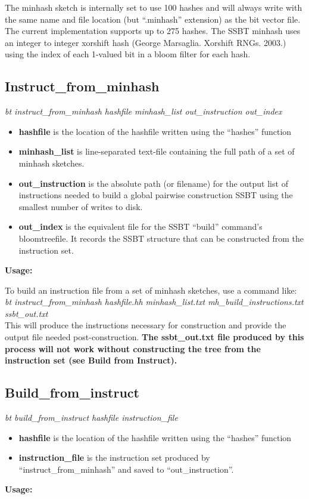 \documentclass{article}
\begin{document}
The minhash sketch is internally set to use 100 hashes and will always write with the same name and file location (but ``.minhash'' extension) as the bit vector file. The current implementation supports up to 275 hashes. The SSBT minhash uses an integer to integer xorshift hash (George Marsaglia. Xorshift RNGs. 2003.) using the index of each 1-valued bit in a bloom filter for each hash.

\subsection{Instruct\_from\_minhash}
\textit{bt instruct\_from\_minhash hashfile minhash\_list out\_instruction out\_index}
\begin{itemize}
\item \textbf{hashfile} is the location of the hashfile written using the ``hashes'' function
\item \textbf{minhash\_list} is line-separated text-file containing the full path of a set of minhash sketches. 
\item \textbf{out\_instruction} is the absolute path (or filename) for the output list of instructions needed to build a global pairwise construction SSBT using the smallest number of writes to disk.
\item \textbf{out\_index} is the equivalent file for the SSBT ``build'' command's bloomtreefile. It records the SSBT structure that can be constructed from the instruction set.
\end{itemize}
\textbf{Usage:}

To build an instruction file from a set of minhash sketches, use a command like: \\

\textit{bt instruct\_from\_minhash hashfile.hh minhash\_list.txt mh\_build\_instructions.txt ssbt\_out.txt} \\

This will produce the instructions necessary for construction and provide the output file needed post-construction. \textbf{The ssbt\_out.txt file produced by this process will not work without constructing the tree from the instruction set (see Build from Instruct).}

\subsection{Build\_from\_instruct}
\textit{bt build\_from\_instruct hashfile instruction\_file}
\begin{itemize}
\item \textbf{hashfile} is the location of the hashfile written using the ``hashes'' function
\item \textbf{instruction\_file} is the instruction set produced by ``instruct\_from\_minhash'' and saved to ``out\_instruction''.
\end{itemize}
\textbf{Usage:}
\end{document}
